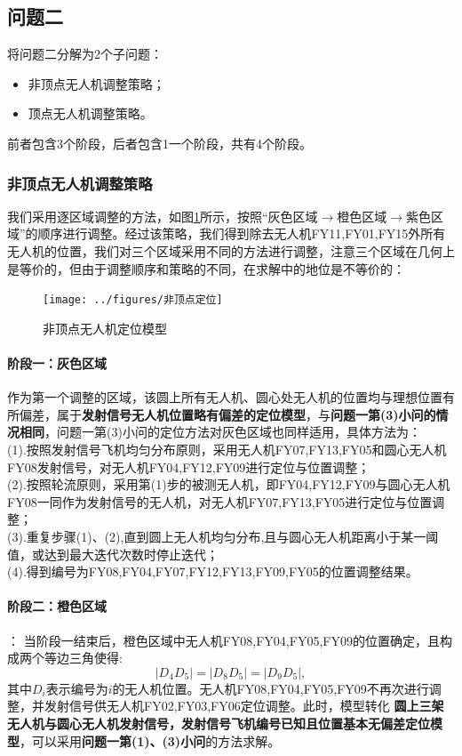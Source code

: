 \documentclass[withoutpreface,bwprint]{cumcmthesis} %
\begin{document}
		\subsection{问题二}
		将问题二分解为2个子问题：
		\begin{itemize}
			\item 非顶点无人机调整策略；
			\item 顶点无人机调整策略。
		\end{itemize}
		前者包含3个阶段，后者包含1一个阶段，共有4个阶段。
		\subsubsection{非顶点无人机调整策略}    
		我们采用逐区域调整的方法，如图\ref{非顶点}所示，按照“灰色区域$\longrightarrow{}$橙色区域$\longrightarrow{}$紫色区域”的顺序进行调整。经过该策略，我们得到除去无人机{FY11,FY01,FY15}外所有无人机的位置，我们对三个区域采用不同的方法进行调整，注意三个区域在几何上是等价的，但由于调整顺序和策略的不同，在求解中的地位是不等价的：
		\begin{figure}[htb]
			\centering
			\texttt{[image: ../figures/非顶点定位]}
			\caption{非顶点无人机定位模型}
			\label{非顶点}
		\end{figure}
		\paragraph{阶段一：灰色区域}作为第一个调整的区域，该圆上所有无人机、圆心处无人机的位置均与理想位置有所偏差，属于\textbf{发射信号无人机位置略有偏差的定位模型}，与\textbf{问题一第(3)小问的情况相同}，问题一第(3)小问的定位方法对灰色区域也同样适用，具体方法为：\\
		(1).按照发射信号飞机均匀分布原则，采用无人机FY07,FY13,FY05和圆心无人机FY08发射信号，对无人机FY04,FY12,FY09进行定位与位置调整；\\
		(2).按照轮流原则，采用第(1)步的被测无人机，即FY04,FY12,FY09与圆心无人机FY08一同作为发射信号的无人机，对无人机FY07,FY13,FY05进行定位与位置调整；\\
		(3).重复步骤(1)、(2),直到圆上无人机均匀分布,且与圆心无人机距离小于某一阈值，或达到最大迭代次数时停止迭代；\\
		(4).得到编号为{FY08,FY04,FY07,FY12,FY13,FY09,FY05}的位置调整结果。
		\paragraph{阶段二：橙色区域}：
		当阶段一结束后，橙色区域中无人机{FY08,FY04,FY05,FY09}的位置确定，且构成两个等边三角使得:$$|D_4D_5|=|D_8D_5|=|D_9D_5|,$$其中$D_i$表示编号为$i$的无人机位置。无人机{FY08,FY04,FY05,FY09}不再次进行调整，并发射信号供无人机{FY02,FY03,FY06}定位调整。此时，模型转化\textbf{ 圆上三架无人机与圆心无人机发射信号，发射信号飞机编号已知且位置基本无偏差定位模型}，可以采用\textbf{问题一第(1)、(3)小问}的方法求解。
		
\end{document}
